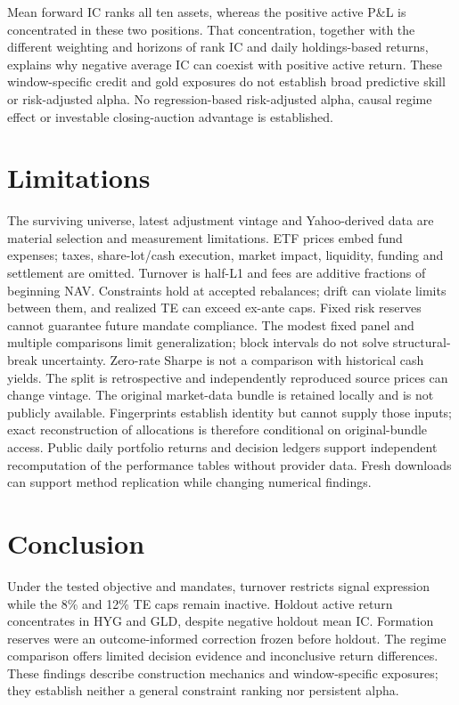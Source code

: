 \documentclass[11pt,a4paper]{article}
\begin{document}
Mean forward IC ranks all ten assets, whereas the positive active P\&L is concentrated in these two positions. That concentration, together with the different weighting and horizons of rank IC and daily holdings-based returns, explains why negative average IC can coexist with positive active return. These window-specific credit and gold exposures do not establish broad predictive skill or risk-adjusted alpha.
No regression-based risk-adjusted alpha,
causal regime effect or investable closing-auction advantage is established.
\section{Limitations}
The surviving universe, latest adjustment vintage and Yahoo-derived data are
material selection and measurement limitations. ETF prices embed fund expenses;
taxes, share-lot/cash execution, market impact, liquidity, funding and settlement
are omitted. Turnover is half-L1 and fees are additive fractions of beginning NAV.
Constraints hold at accepted rebalances; drift can violate limits between them,
and realized TE can exceed ex-ante caps. Fixed risk reserves cannot guarantee
future mandate compliance. The modest fixed panel and multiple comparisons limit
generalization; block intervals do not solve structural-break uncertainty.
Zero-rate Sharpe is not a comparison with historical cash yields. The split is
retrospective and independently reproduced source prices can change vintage.
The original market-data bundle is retained locally and is not publicly
available. Fingerprints establish identity but cannot supply those inputs;
exact reconstruction of allocations is therefore conditional on original-bundle access.
Public daily portfolio returns and decision ledgers support independent
recomputation of the performance tables without provider data.
Fresh downloads can support method replication while changing numerical findings.
\section{Conclusion}
Under the tested objective and mandates, turnover restricts signal expression
while the 8\% and 12\% TE caps remain inactive. Holdout active return concentrates
in HYG and GLD, despite negative holdout mean IC. Formation reserves were an
outcome-informed correction frozen before holdout. The regime comparison offers limited
decision evidence and inconclusive return differences. These findings describe
construction mechanics and window-specific exposures; they establish neither
a general constraint ranking nor persistent alpha.
\end{document}
